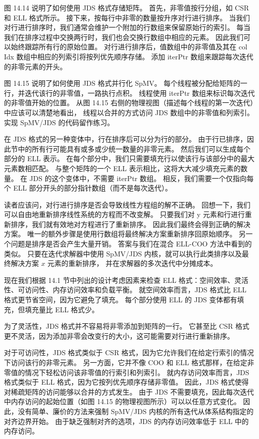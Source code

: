 图 14.14 说明了如何使用 JDS 格式存储矩阵。 首先，非零值按行分组，如 CSR 和 ELL 格式所示。 
接下来，按每行中非零的数量按升序对行进行排序。 当我们对行进行排序时，我们通常会维护一个附加的行数组来保留原始行的索引。 
每当我们在排序过程中交换两行时，我们也会交换行数组中相应的元素。 因此我们可以始终跟踪所有行的原始位置。 
对行进行排序后，值数组中的非零值及其在 col Idx 数组中相应的列索引将按列优先顺序存储。 
添加 iterPtr 数组来跟踪每次迭代的非零元素的开头。

图 14.15 说明了如何使用 JDS 格式并行化 SpMV。 每个线程被分配给矩阵的一行，并迭代该行的非零值，一路执行点积。 
线程使用 iterPtr 数组来标识每次迭代的非零值开始的位置。 
从图 14.15 右侧的物理视图（描述每个线程的第一次迭代）中应该可以清楚地看出，
线程以合并的方式访问 JDS 数组中的非零值和列索引。 实现 SpMV/JDS 的代码留作练习。

在 JDS 格式的另一种变体中，行在排序后可以分为行的部分。 
由于行已排序，因此节中的所有行可能具有或多或少统一数量的非零元素。 然后我们可以生成每个部分的 ELL 表示。 
在每个部分中，我们只需要填充行以使该行与该部分中的最大元素数相匹配。 
与整个矩阵的一个 ELL 表示相比，这将大大减少填充元素的数量。 在 JDS 的这个变体中，不需要 iterPtr 数组。 
相反，我们需要一个仅指向每个 ELL 部分开头的部分指针数组（而不是每次迭代）。

读者应该问，对行进行排序是否会导致线性方程组的解不正确。 回想一下，我们可以自由地重新排序线性系统的方程而不改变解。 
只要我们对 y 元素和行进行重新排序，我们就有效地对方程进行了重新排序。 因此我们最终会得到正确的解决方案。 
唯一的额外步骤是使用行数组将最终解决方案重新排序回原始顺序。 另一个问题是排序是否会产生大量开销。 
答案与我们在混合 ELL-COO 方法中看到的类似。 
只要在迭代求解器中使用 SpMV/JDS 内核，就可以执行此类排序以及最终解决方案 $x$ 元素的重新排序，
并在求解器的多次迭代中分摊成本。

现在我们根据 14.1 节中列出的设计考虑因素来检查 ELL 格式：空间效率、灵活性、可访问性、内存访问效率和负载平衡。 
就空间效率而言，JDS 格式比 ELL 格式更节省空间，因为它避免了填充。 
每个部分使用 ELL 的 JDS 变体都有填充，但填充量比 ELL 格式少。

为了灵活性，JDS 格式并不容易将非零添加到矩阵的一行。 
它甚至比 CSR 格式更不灵活，因为添加非零会改变行的大小，这可能需要对行进行重新排序。

对于可访问性，JDS 格式类似于 CSR 格式，因为它允许我们在给定行索引的情况下访问该行的非零元素。 
另一方面，它并不像 COO 和 ELL 格式那样，在给定非零值的情况下轻松访问该非零值的行索引和列索引。 
就内存访问效率而言，JDS 格式类似于 ELL 格式，因为它按列优先顺序存储非零值。 
因此，JDS 格式使得对稀疏矩阵的访问能够以合并的方式发生。 
由于 JDS 不需要填充，因此每次迭代中内存访问的起始位置（如图 14.15 的物理视图所示）可以以任意方式变化。 
因此，没有简单、廉价的方法来强制 SpMV/JDS 内核的所有迭代从体系结构指定的对齐边界开始。 
由于缺乏强制对齐的选项，JDS 的内存访问效率低于 ELL 中的内存访问。

